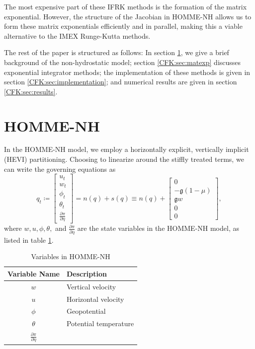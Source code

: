 \documentclass{csri19}
\newcommand{\CFKg}{\mathfrak{g}}
\begin{document}
The most expensive part of these IFRK methods is the formation of the 
matrix exponential. However, the structure of the Jacobian in HOMME-NH 
allows us to form these matrix exponentials efficiently and in parallel, 
making this a viable alternative to the IMEX Runge-Kutta methods.

The rest of the paper is structured as follows: In section 
\ref{CFK:sec:homme}, we give a brief background of the non-hydrostatic 
model; section \ref{CFK:sec:matexp} discusses exponential integrator 
methods; the implementation of these methods is given in section 
\ref{CFK:sec:implementation}; and numerical results are given in section 
\ref{CFK:sec:results}.

\section{HOMME-NH}\label{CFK:sec:homme}
In the HOMME-NH model, we employ a horizontally explicit, vertically 
implicit (HEVI) partitioning. Choosing to linearize around the stiffly 
treated terms, we can write the governing equations as
\[q_t \coloneqq \begin{bmatrix} u_t \\
w_t\\
\phi_t\\
\theta_t\\
\frac{\partial \pi}{\partial \eta}
\end{bmatrix} = n(q) + s(q) \equiv n(q) + \begin{bmatrix}
0\\
-\CFKg (1-\mu)\\
\CFKg w\\
0\\
0\end{bmatrix},\] 
where $w, u,\phi, \theta,$ and $\frac{\partial \pi}{\partial \eta}$ are the
 state variables in the HOMME-NH model, as listed in table \ref{CFK:tab:variables}.

\begin{table}
  \caption{Variables in HOMME-NH}
  \label{CFK:tab:variables}
  \begin{center}
    \begin{tabular}{|c|l|}
      \hline
      \textbf{Variable Name} & \textbf{Description} \\
      \hline
      $w$                                & Vertical velocity      \\
      $u$                                & Horizontal velocity    \\
      $\phi$                             & Geopotential           \\
      $\theta$                           & Potential temperature  \\
      $\frac{\partial\pi}{\partial\eta}$ &                        \\
      \hline
    \end{tabular}
  \end{center}
\end{table}
\end{document}

